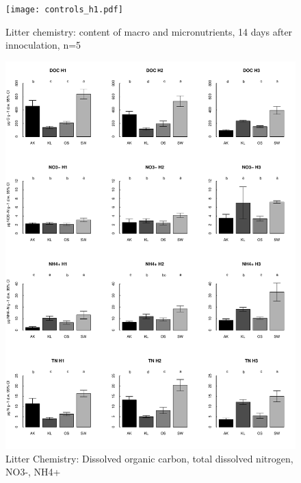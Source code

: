 \newpage
 \begin{figure}[p]
 \vspace*{2mm}
 \begin{center}
 \texttt{[image: controls\_h1.pdf]}
 \end{center}
 \caption{Litter chemistry: content of macro and micronutrients, 14 days after innoculation, n=5}
 \end{figure}


\newpage
\begin{figure}[p]
\vspace*{2mm}
\begin{center}
\includegraphics[width=15cm]{doc_barplots.pdf}
\end{center}
\caption{Litter Chemistry: Dissolved organic carbon, total dissolved nitrogen, NO3-, NH4+}
\end{figure}

